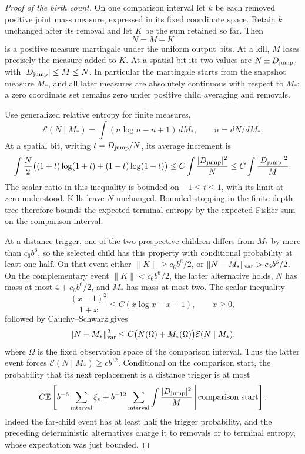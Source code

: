 \begin{proof}[Proof of the birth count]
On one comparison interval let $k$ be each removed positive joint mass
measure, expressed in its fixed coordinate space. Retain $k$ unchanged
after its removal and let $K$ be the sum retained so far. Then
\[
 N=M+K
\]
is a positive measure martingale under the uniform output bits. At a kill,
$M$ loses precisely the measure added to $K$. At a spatial bit its two
values are $N\pm D_{\rm jump}$, with
$|D_{\rm jump}|\le M\le N$. In particular the martingale starts from the
snapshot measure $M_*$, and all later measures are absolutely continuous
with respect to $M_*$: a zero coordinate set remains zero under positive
child averaging and removals.

Use generalized relative entropy for finite measures,
\[
 \mathcal E(N\mid M_*)=
       \int(n\log n-n+1)\,dM_*,\qquad n=dN/dM_*.
\]
At a spatial bit, writing $t=D_{\rm jump}/N$, its average increment is
\[
 \int \frac N2\bigl((1+t)\log(1+t)+(1-t)\log(1-t)\bigr)
 \le C\int\frac{|D_{\rm jump}|^2}{N}
 \le C\int\frac{|D_{\rm jump}|^2}{M}.
\]
The scalar ratio in this inequality is bounded on $-1\le t\le1$, with
its limit at zero understood. Kills leave $N$ unchanged. Bounded stopping
in the finite-depth tree therefore bounds the expected terminal entropy
by the expected Fisher sum on the comparison interval.

At a distance trigger, one of the two prospective children differs from
$M_*$ by more than $c_6b^6$, so the selected child has this property with
conditional probability at least one half. On that event either
$\|K\|\ge c_6b^6/2$, or
$\|N-M_*\|_{\rm var}>c_6b^6/2$. On the complementary event $\|K\|<c_6b^6/2$, the latter alternative
holds, $N$ has mass at most $4+c_6b^6/2$, and $M_*$ has mass at most two. The scalar inequality
\[
 \frac{(x-1)^2}{1+x}\le C(x\log x-x+1),\qquad x\ge0,
\]
followed by Cauchy--Schwarz gives
\[
 \|N-M_*\|_{\rm var}^2
 \le C\bigl(N(\Omega)+M_*(\Omega)\bigr)\mathcal E(N\mid M_*),
\]
where $\Omega$ is the fixed observation space of the comparison interval.
Thus the latter event forces
$\mathcal E(N\mid M_*)\ge c b^{12}$. Conditional on the comparison start,
the probability that its next replacement is a distance trigger is at most
\begin{equation}\label{eq:07-trigger-charge}
 C\mathbb E\left[
       b^{-6}\sum_{\rm interval}\xi_p
       +b^{-12}\sum_{\rm interval}
                      \int\frac{|D_{\rm jump}|^2}{M}
             \,\middle|\,\text{comparison start}\right].
\end{equation}
Indeed the far-child event has at least half the trigger probability, and
the preceding deterministic alternatives charge it to removals or to
terminal entropy, whose expectation was just bounded.


\end{proof}
